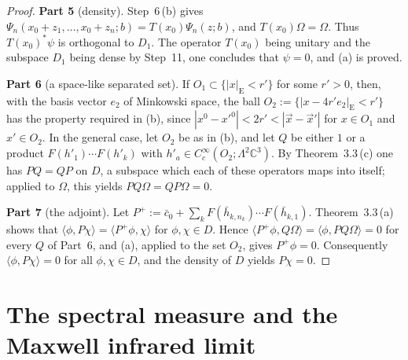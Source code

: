 \documentclass[11pt,letterpaper,reqno]{amsart}
\theoremstyle{definition}
\begin{document}
\begin{proof}
\textbf{Part 5} (density).
Step~6\,(b) gives $\Psi_n(x_0+z_1,\dots,x_0+z_n;b)=T(x_0)\Psi_n(z;b)$, and $T(x_0)\Omega=\Omega$.
Thus $T(x_0)^*\psi$ is orthogonal to $D_1$.
The operator $T(x_0)$ being unitary and the subspace $D_1$ being dense by Step~11, one concludes that $\psi=0$, and (a) is proved.

\textbf{Part 6} (a space-like separated set).
If $O_1\subset\{|x|_{\mathrm E}<r'\}$ for some $r'>0$, then, with the basis vector $e_2$ of Minkowski space, the ball $O_2:=\{|x-4r'e_2|_{\mathrm E}<r'\}$ has the property required in (b), since $|x^0-x'^0|<2r'<|\vec x-\vec x'|$ for $x\in O_1$ and $x'\in O_2$.
In the general case, let $O_2$ be as in (b), and let $Q$ be either $1$ or a product $F(h'_1)\cdots F(h'_k)$ with $h'_a\in C_c^\infty(O_2;\Lambda^2\mathbb C^3)$.
By Theorem~3.3\,(c) one has $PQ=QP$ on $D$, a subspace which each of these operators maps into itself; applied to $\Omega$, this yields $PQ\Omega=QP\Omega=0$.

\textbf{Part 7} (the adjoint).
Let $P^+:=\bar c_0+\sum_kF(\bar h_{k,n_k})\cdots F(\bar h_{k,1})$.
Theorem~3.3\,(a) shows that $\langle\phi,P\chi\rangle=\langle P^+\phi,\chi\rangle$ for $\phi,\chi\in D$.
Hence $\langle P^+\phi,Q\Omega\rangle=\langle\phi,PQ\Omega\rangle=0$ for every $Q$ of Part~6, and (a), applied to the set $O_2$, gives $P^+\phi=0$.
Consequently $\langle\phi,P\chi\rangle=0$ for all $\phi,\chi\in D$, and the density of $D$ yields $P\chi=0$.
\end{proof}


\section{The spectral measure and the Maxwell infrared limit}
\end{document}
